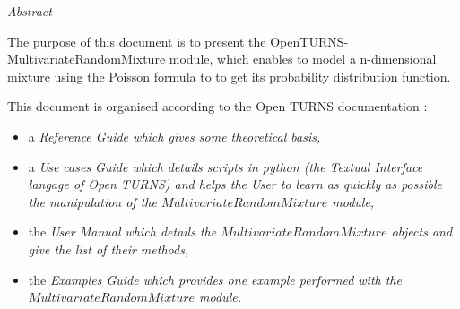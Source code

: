 \vspace{0.5in}
\begin{center}
\vspace{0.3in}
\emph{ Abstract}
\vspace{0.5in}
\end{center}

The purpose of this document is to present the OpenTURNS-MultivariateRandomMixture module, which enables to model a n-dimensional mixture using the 
Poisson formula to to get its probability distribution function.

This document is organised according to the Open TURNS documentation :
\begin{itemize}
\item a \itshape{Reference Guide} which gives some theoretical basis,
\item a \itshape{Use cases Guide} which details scripts in python (the Textual Interface langage of Open TURNS) and helps the User to learn as quickly as possible the manipulation of the $MultivariateRandomMixture$ module,
\item the \itshape{User Manual} which details the $MultivariateRandomMixture$ objects and give the list of their methods,
\item the \itshape{Examples Guide} which provides one example performed with the $MultivariateRandomMixture$ module.
\end{itemize}

